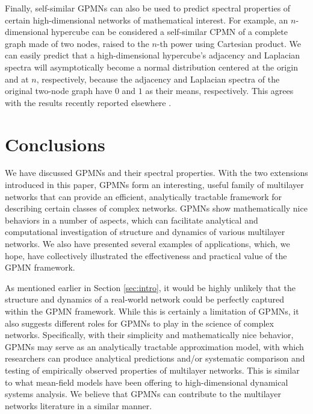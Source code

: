 \documentclass{article}
\begin{document}
Finally, self-similar GPMNs can also be used to predict spectral
properties of certain high-dimensional networks of mathematical
interest. For example, an $n$-dimensional hypercube can be considered
a self-similar CPMN of a complete graph made of two nodes, raised to
the $n$-th power using Cartesian product. We can easily predict that a
high-dimensional hypercube's adjacency and Laplacian spectra will
asymptotically become a normal distribution centered at the origin and
at $n$, respectively, because the adjacency and Laplacian spectra of
the original two-node graph have $0$ and $1$ as their means,
respectively. This agrees with the results recently reported elsewhere
\cite{florkowski2008spectral}.

\section{Conclusions}
\label{sec:conclusions}

We have discussed GPMNs and their spectral properties. With the two
extensions introduced in this paper, GPMNs form an interesting, useful
family of multilayer networks that can provide an efficient,
analytically tractable framework for describing certain classes of
complex networks. GPMNs show mathematically nice behaviors in a number
of aspects, which can facilitate analytical and computational
investigation of structure and dynamics of various multilayer
networks. We also have presented several examples of applications,
which, we hope, have collectively illustrated the effectiveness and
practical value of the GPMN framework.

As mentioned earlier in Section \ref{sec:intro}, it would be highly
unlikely that the structure and dynamics of a real-world network could
be perfectly captured within the GPMN framework. While this is
certainly a limitation of GPMNs, it also suggests different roles for
GPMNs to play in the science of complex networks. Specifically, with
their simplicity and mathematically nice behavior, GPMNs may serve as
an analytically tractable approximation model, with which researchers
can produce analytical predictions and/or systematic comparison and
testing of empirically observed properties of multilayer
networks. This is similar to what mean-field models have been offering
to high-dimensional dynamical systems analysis. We believe that GPMNs
can contribute to the
multilayer networks literature in a similar manner.
\end{document}
